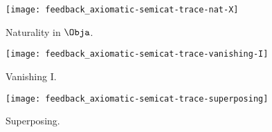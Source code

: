 \begin{figure}[h!]
    \centering
    \texttt{[image: feedback\_axiomatic-semicat-trace-nat-X]}
    \caption{Naturality in $\Obja$.}
    \label{fig:axiomatic-semicat-trace-nat-X}
\end{figure}

\begin{figure}[h!]
    \centering
    \texttt{[image: feedback\_axiomatic-semicat-trace-vanishing-I]}
    \caption{Vanishing I.}
    \label{fig:axiomatic-semicat-trace-vanishing-I}
\end{figure}

\begin{figure}[h!]
    \centering
    \texttt{[image: feedback\_axiomatic-semicat-trace-superposing]}
    \caption{Superposing.}
    \label{fig:axiomatic-semicat-trace-superposing}
\end{figure}

